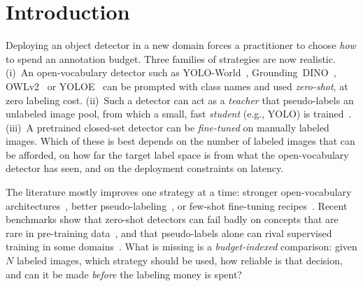 \section{Introduction}
Deploying an object detector in a new domain forces a practitioner to choose \emph{how} to spend an annotation budget. Three families of strategies are now realistic. (i)~An open-vocabulary detector such as YOLO-World~\cite{cheng2024yoloworld}, Grounding~DINO~\cite{liu2024groundingdino}, OWLv2~\cite{minderer2023owlv2} or YOLOE~\cite{wang2025yoloe} can be prompted with class names and used \emph{zero-shot}, at zero labeling cost. (ii)~Such a detector can act as a \emph{teacher} that pseudo-labels an unlabeled image pool, from which a small, fast \emph{student} (e.g., YOLO) is trained~\cite{son2024teacherstudent,xin2024dart}. (iii)~A pretrained closed-set detector can be \emph{fine-tuned} on manually labeled images. Which of these is best depends on the number of labeled images that can be afforded, on how far the target label space is from what the open-vocabulary detector has seen, and on the deployment constraints on latency.

The literature mostly improves one strategy at a time: stronger open-vocabulary architectures~\cite{cheng2024yoloworld,liu2024groundingdino,minderer2023owlv2,wang2025yoloe}, better pseudo-labeling~\cite{gao2022pseudobox,liu2021unbiased,xu2021softteacher}, or few-shot fine-tuning recipes~\cite{wang2020tfa}. Recent benchmarks show that zero-shot detectors can fail badly on concepts that are rare in pre-training data~\cite{robicheaux2025rf100vl}, and that pseudo-labels alone can rival supervised training in some domains~\cite{abid2025waste}. What is missing is a \emph{budget-indexed} comparison: given $N$ labeled images, which strategy should be used, how reliable is that decision, and can it be made \emph{before} the labeling money is spent?

